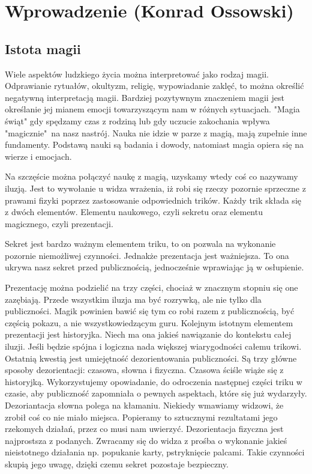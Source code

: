 \section{Wprowadzenie (Konrad Ossowski)}

\subsection{Istota magii}
Wiele aspektów ludzkiego życia można interpretować jako rodzaj magii. Odprawianie rytuałów, okultyzm, religię, wypowiadanie zaklęć, to można określić negatywną interpretacją magii. Bardziej pozytywnym znaczeniem magii jest określanie jej mianem emocji towarzyszącym nam w różnych sytuacjach. "Magia świąt" gdy spędzamy czas z rodziną lub gdy uczucie zakochania wpływa "magicznie"\ na nasz nastrój. Nauka nie idzie w parze z magią, mają zupełnie inne fundamenty. Podstawą nauki są badania i dowody, natomiast magia opiera się na wierze i emocjach.\par Na szczęście można połączyć naukę z magią, uzyskamy wtedy coś co nazywamy iluzją. Jest to wywołanie u widza wrażenia, iż robi się rzeczy pozornie sprzeczne z prawami fizyki poprzez zastosowanie odpowiednich trików. Każdy trik składa się z dwóch elementów. Elementu naukowego, czyli sekretu oraz elementu magicznego, czyli prezentacji.\par Sekret jest bardzo ważnym elementem triku, to on pozwala na wykonanie pozornie niemożliwej czynności. Jednakże prezentacja jest ważniejsza. To ona ukrywa nasz sekret przed publicznością, jednocześnie wprawiając ją w osłupienie.\par Prezentację można podzielić na trzy części, chociaż w znacznym stopniu się one zazębiają. Przede wszystkim iluzja ma być rozrywką, ale nie tylko dla publiczności. Magik powinien bawić się tym co robi razem z publicznością, być częścią pokazu, a nie wszystkowiedzącym guru. Kolejnym istotnym elementem prezentacji jest historyjka. Niech ma ona jakieś nawiązanie do kontekstu całej iluzji. Jeśli będzie spójna i logiczna nada większej wiarygodności całemu trikowi. Ostatnią kwestią jest umiejętność dezorientowania publiczności. Są trzy główne sposoby dezorientacji: czasowa, słowna i fizyczna. Czasowa ściśle wiąże się z historyjką. Wykorzystujemy opowiadanie, do odroczenia następnej części triku w czasie, aby publiczność zapomniała o pewnych aspektach, które się już wydarzyły. Dezoriantacja słowna polega na kłamaniu. Niekiedy wmawiamy widzowi, że zrobił coś co nie miało miejsca. Popieramy to sztucznymi rezultatami jego rzekomych działań, przez co musi nam uwierzyć. Dezorientacja fizyczna jest najprostsza z podanych. Zwracamy się do widza z prośba o wykonanie jakieś nieistotnego działania np. popukanie karty, pstryknięcie palcami. Takie czynności skupią jego uwagę, dzięki czemu sekret pozostaje bezpieczny.
